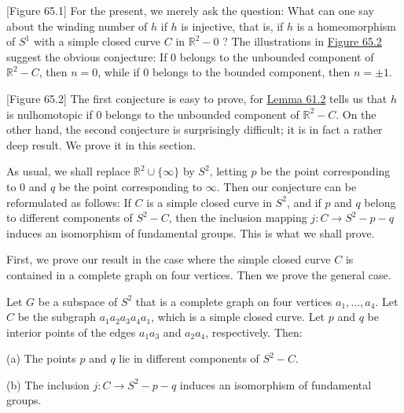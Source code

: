 [Figure 65.1]
For the present, we merely ask the question: What can one say about the winding number of \(h\) if \(h\) is injective, that is, if \(h\) is a homeomorphism of \(S^{1}\) with a simple closed curve \(C\) in \(\mathbb{R}^{2} - 0\) ? The illustrations in \hyperref[fig:65.2]{Figure 65.2} suggest the obvious conjecture: If 0 belongs to the unbounded component of \(\mathbb{R}^{2} - C\), then \(n = 0\), while if 0 belongs to the bounded component, then \(n = \pm 1\).

[Figure 65.2]
The first conjecture is easy to prove, for \hyperref[lem:61.2]{Lemma 61.2} tells us that \(h\) is nulhomotopic if 0 belongs to the unbounded component of \(\mathbb{R}^{2} - C\). On the other hand, the second conjecture is surprisingly difficult; it is in fact a rather deep result. We prove it in this section.

As usual, we shall replace \(\mathbb{R}^{2} \cup \{ \infty \}\) by \(S^{2}\), letting \(p\) be the point corresponding to 0 and \(q\) be the point corresponding to \(\infty\). Then our conjecture can be reformulated as follows: If \(C\) is a simple closed curve in \(S^{2}\), and if \(p\) and \(q\) belong to different components of \(S^{2} - C\), then the inclusion mapping \(j : C \rightarrow {S}^{2} - p - q\) induces an isomorphism of fundamental groups. This is what we shall prove.

First, we prove our result in the case where the simple closed curve \(C\) is contained in a complete graph on four vertices. Then we prove the general case.

\begin{lemma}
\label{lem:\thetheorem}
Let \(G\) be a subspace of \(S^{2}\) that is a complete graph on four vertices \(a_{1},\ldots ,a_{4}\). Let \(C\) be the subgraph \(a_{1}a_{2}a_{3}a_{4}a_{1}\), which is a simple closed curve. Let \(p\) and \(q\) be interior points of the edges \(a_{1}a_{3}\) and \(a_{2}a_{4}\), respectively. Then:

(a) The points \(p\) and \(q\) lie in different components of \(S^{2} - C\).

(b) The inclusion \(j : C \rightarrow {S}^{2} - p - q\) induces an isomorphism of fundamental groups.
\end{lemma}

